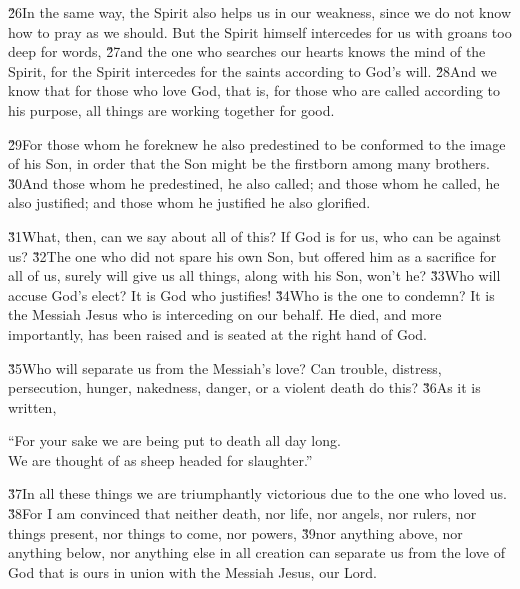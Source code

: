 \v{26}In the same way, the Spirit also helps us in our weakness, since we do not know how to pray as we should. But the Spirit himself intercedes for us with groans too deep for words, \v{27}and the one who searches our hearts knows the mind of the Spirit, for the Spirit intercedes for the saints according to God's will. \v{28}And we know that for those who love God, that is, for those who are called according to his purpose, all things are working together for good.

\v{29}For those whom he foreknew he also predestined to be conformed to the image of his Son, in order that the Son might be the firstborn among many brothers. \v{30}And those whom he predestined, he also called; and those whom he called, he also justified; and those whom he justified he also glorified.

\v{31}What, then, can we say about all of this? If God is for us, who can be against us? \v{32}The one who did not spare his own Son, but offered him as a sacrifice for all of us, surely will give us all things, along with his Son, won't he? \v{33}Who will accuse God's elect? It is God who justifies! \v{34}Who is the one to condemn? It is the Messiah Jesus who is interceding on our behalf. He died, and more importantly, has been raised and is seated at the right hand of God.

\v{35}Who will separate us from the Messiah's love? Can trouble, distress, persecution, hunger, nakedness, danger, or a violent death do this? \v{36}As it is written,

\begin{poetry}
\poeml ``For your sake we are being put to death all day long. \\
\poemll    We are thought of as sheep headed for slaughter.''
\end{poetry}

\v{37}In all these things we are triumphantly victorious due to the one who loved us. \v{38}For I am convinced that neither death, nor life, nor angels, nor rulers, nor things present, nor things to come, nor powers, \v{39}nor anything above, nor anything below, nor anything else in all creation can separate us from the love of God that is ours in union with the Messiah Jesus, our Lord.

